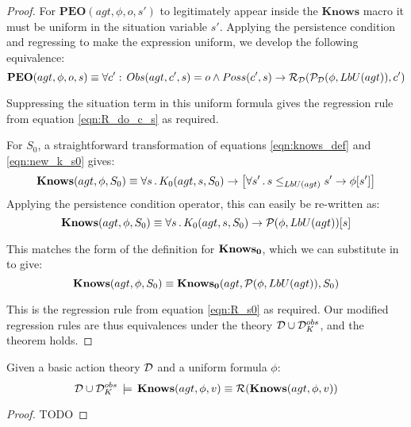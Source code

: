\begin{proof}
For $\mathbf{PEO}(agt,\phi,o,s')$ to legitimately appear inside the
$\mathbf{Knows}$ macro it must be uniform in the situation variable
$s'$. Applying the persistence condition and regressing to make the
expression uniform, we develop the following equivalence:\[
\mathbf{PEO}(agt,\phi,o,s)\equiv\forall c':\, Obs(agt,c',s)=o\wedge Poss(c',s)\rightarrow\mathcal{R}_{\mathcal{D}}(\mathcal{P}_{\mathcal{D}}(\phi,LbU(agt)),c')\]


Suppressing the situation term in this uniform formula gives the regression
rule from equation \eqref{eqn:R_do_c_s} as required.

For $S_{0}$, a straightforward transformation of equations \eqref{eqn:knows_def}
and \eqref{eqn:new_k_s0} gives:\[
\mathbf{Knows}(agt,\phi,S_{0})\equiv\forall s\,.\, K_{0}(agt,s,S_{0})\rightarrow\left[\forall s'\,.\, s\leq_{LbU(agt)}s'\rightarrow\phi[s']\right]\]
 Applying the persistence condition operator, this can easily be re-written
as:\[
\mathbf{Knows}(agt,\phi,S_{0})\equiv\forall s\,.\, K_{0}(agt,s,S_{0})\rightarrow\mathcal{P}(\phi,LbU(agt))[s]\]


This matches the form of the definition for $\mathbf{Knows_{0}}$, which we can
substitute in to give:\[
\mathbf{Knows}(agt,\phi,S_{0})\equiv\mathbf{Knows_{0}}(agt,\mathcal{P}(\phi,LbU(agt)),S_{0})\]


This is the regression rule from equation \eqref{eqn:R_s0} as required.
Our modified regression rules are thus equivalences under the theory
$\mathcal{D}\cup\mathcal{D}_{K}^{obs}$, and the theorem holds. 
\end{proof}
\medskip{}

\begin{thmext}
[{{[}{\ref{thm:Reg_KnowsO}}]}]
Given a basic action theory $\mathcal{D}$ and a uniform
formula $\phi$:\[
\mathcal{D}\cup\mathcal{D}_{K}^{obs}\,\models\,\mathbf{Knows}(agt,\phi,v)\equiv\mathcal{R}(\mathbf{Knows}(agt,\phi,v))\]

\end{thmext}
\begin{proof}
TODO
\end{proof}


